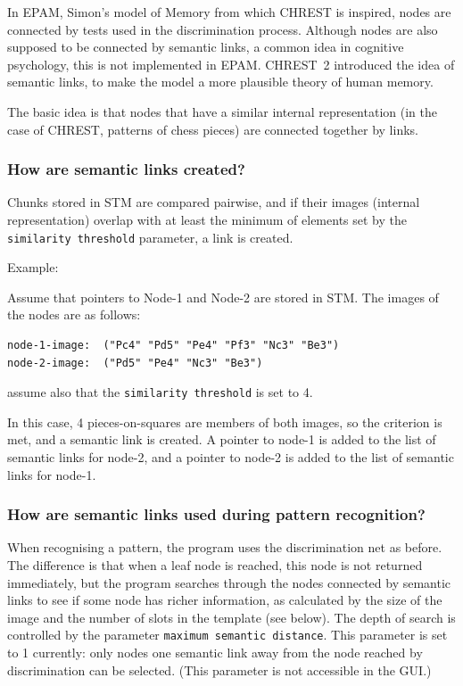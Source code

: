 \documentclass{article}
\begin{document}
In EPAM, Simon's model of Memory from which CHREST is inspired, nodes are
connected by tests used in the discrimination process.  Although nodes are also
supposed to be connected by semantic links, a common idea in cognitive
psychology, this is not implemented in EPAM.  CHREST~2 introduced the idea of
semantic links, to make the model a more plausible theory of human memory.

The basic idea is that nodes that have a similar internal representation (in the case
of CHREST, patterns of chess pieces) are connected together by links. 

\subsubsection{How are semantic links created?}

Chunks stored in STM are compared pairwise, and if their images 
(internal representation) overlap with at least the minimum of elements set
by the {\tt similarity threshold} parameter, a link is created.

Example:

Assume that pointers to Node-1 and Node-2 are stored in STM. The images of the
nodes are as follows:

\begin{verbatim}
node-1-image:  ("Pc4" "Pd5" "Pe4" "Pf3" "Nc3" "Be3")
node-2-image:  ("Pd5" "Pe4" "Nc3" "Be3")
\end{verbatim}

assume also that the {\tt similarity threshold} is set to 4.

In this case, 4 pieces-on-squares are members of both images, so the criterion 
is met, and a semantic link is created. A pointer to node-1 is added to 
the list of semantic links for node-2, and a pointer to node-2 is added to 
the list of semantic links for node-1.

\subsubsection{How are semantic links used during pattern recognition?}

When recognising a pattern, the program uses the discrimination net as before.
The difference is that when a leaf node is reached, this node is not returned
immediately, but the program searches through the nodes connected by semantic
links to see if some node has richer information, as calculated by the size of
the image and the number of slots in the template (see below). The depth of
search is controlled by the parameter {\tt maximum semantic distance}. This
parameter is set to 1 currently: only nodes one semantic link away from the
node reached by discrimination can be selected.  (This parameter is not
accessible in the GUI.)
\end{document}
